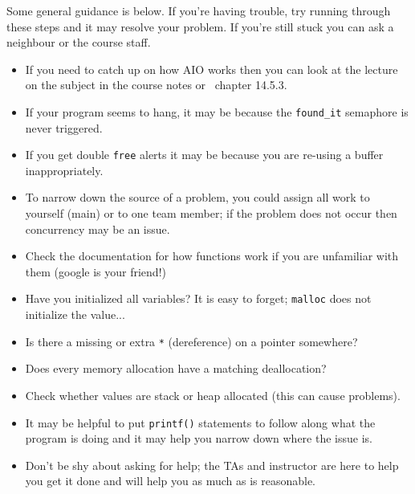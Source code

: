 \documentclass[a4paper]{report}
\begin{document}
Some general guidance is below. If you're having trouble, try running through these steps and it may resolve your problem. If you're still stuck you can ask a neighbour or the course staff.
\begin{itemize}
	\item If you need to catch up on how AIO works then you can look at the lecture on the subject in the course notes or~\cite{apunix} chapter 14.5.3.
	\item If your program seems to hang, it may be because the \texttt{found\_it} semaphore is never triggered.
	\item If you get double \texttt{free} alerts it may be because you are re-using a buffer inappropriately.
	\item To narrow down the source of a problem, you could assign all work to yourself (main) or to one team member; if the problem does not occur then concurrency may be an issue.
	\item Check the documentation for how functions work if you are unfamiliar with them (google is your friend!)
	\item Have you initialized all variables? It is easy to forget; \texttt{malloc} does not initialize the value...
	\item Is there a missing or extra \texttt{*} (dereference) on a pointer somewhere?
	\item Does every memory allocation have a matching deallocation?
	\item Check whether values are stack or heap allocated (this can cause problems).
	\item It may be helpful to put \texttt{printf()} statements to follow along what the program is doing and it may help you narrow down where the issue is.
	\item Don't be shy about asking for help; the TAs and instructor are here to help you get it done and will help you as much as is reasonable.
\end{itemize}




\end{document}
